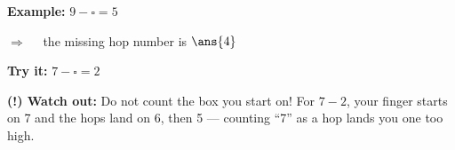 \documentclass[12pt]{article}
\begin{document}
\begin{examplebox}
\textbf{Example:} \quad $9 - \square = 5$

$\Rightarrow\quad$ the missing hop number is $\ans{4}$
\end{examplebox}

\begin{tryitbox}
\textbf{Try it:} \quad $7 - \square = 2$\\[2pt]
\end{tryitbox}

\begin{watchoutbox}
\textbf{(!) Watch out:} Do not count the box you start on! For $7-2$, your
finger starts on 7 and the hops land on 6, then 5 --- counting ``7'' as a
hop lands you one too high.
\end{watchoutbox}
\end{document}
